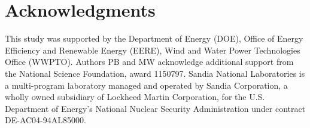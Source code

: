 \documentclass[10pt,letterpaper]{article}
\begin{document}
\section*{Acknowledgments}

This study was supported by the Department of Energy (DOE), Office of Energy
Efficiency and Renewable Energy (EERE), Wind and Water Power Technologies Office
(WWPTO). Authors PB and MW acknowledge additional support from the National
Science Foundation, award 1150797. Sandia National Laboratories is a
multi-program laboratory managed and operated by Sandia Corporation, a wholly
owned subsidiary of Lockheed Martin Corporation, for the U.S. Department of
Energy's National Nuclear Security Administration under contract
DE-AC04-94AL85000.

\nolinenumbers
\end{document}
